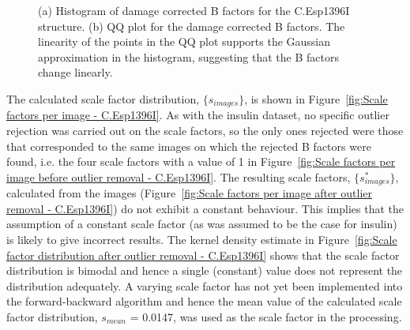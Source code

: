 \begin{figure}
\begin{subfigure}[b]{1.0\textwidth}
            \caption{}
            \label{fig:B factor QQ plot - C.Esp1396I}
    \end{subfigure}
    \caption[Normality of calculated B factor distribution for the C.Esp1396I dataset.]{(a) Histogram of damage corrected B factors for the C.Esp1396I structure.
    (b) QQ plot for the damage corrected B factors.
    The linearity of the points in the QQ plot supports the Gaussian approximation in the histogram, suggesting that the B factors change linearly.}
    \label{fig:Gaussian B factor plots - C.Esp1396I}
\end{figure}

The calculated scale factor distribution, $\{ s_{images} \}$, is shown in Figure~\ref{fig:Scale factors per image - C.Esp1396I}.
As with the insulin dataset, no specific outlier rejection was carried out on the scale factors, so the only ones rejected were those that corresponded to the same images on which the rejected B factors were found, i.e. the four scale factors with a value of 1 in Figure~\ref{fig:Scale factors per image before outlier removal - C.Esp1396I}.
The resulting scale factors, $\{ s^{*}_{images} \}$, calculated from the images (Figure~\ref{fig:Scale factors per image after outlier removal - C.Esp1396I}) do not exhibit a constant behaviour.
This implies that the assumption of a constant scale factor (as was assumed to be the case for insulin) is likely to give incorrect results.
The kernel density estimate in Figure~\ref{fig:Scale factor distribution after outlier removal - C.Esp1396I} shows that the scale factor distribution is bimodal and hence a single (constant) value does not represent the distribution adequately.
A varying scale factor has not yet been implemented into the forward-backward algorithm and hence the mean value of the calculated scale factor distribution, $s_{mean}$ = 0.0147, was used as the scale factor in the processing.

